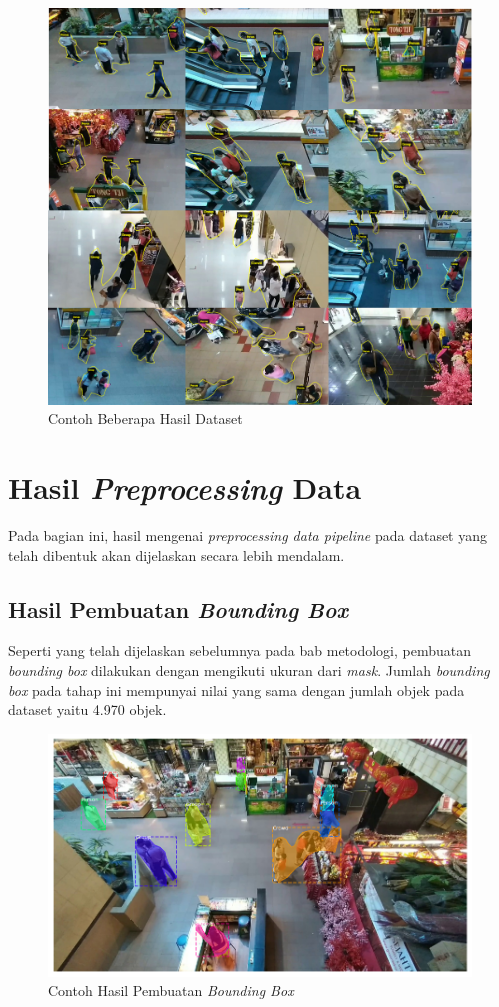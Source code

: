 \begin{figure}[h!]
    \begin{center}
      \includegraphics[width= 0.8\linewidth]{bab4/Dataset.png}
      \caption{Contoh Beberapa Hasil Dataset}
      \label{fig: Dataset}
    \end{center}
\end{figure}

\section{Hasil \textit{Preprocessing} Data}
Pada bagian ini, hasil mengenai \textit{preprocessing data pipeline} pada dataset yang telah dibentuk akan dijelaskan
secara lebih mendalam. 

\subsection{Hasil Pembuatan \textit{Bounding Box}}
Seperti yang telah dijelaskan sebelumnya pada bab metodologi, pembuatan \textit{bounding box} dilakukan dengan
mengikuti ukuran dari \textit{mask}. Jumlah \textit{bounding box} pada tahap ini mempunyai nilai yang sama dengan
jumlah objek pada dataset yaitu 4.970 objek.

\begin{figure}[h!]
  \begin{center}
    \includegraphics[width= 0.8\linewidth]{bab4/Contoh Bounding Box.png}
    \caption{Contoh Hasil Pembuatan \textit{Bounding Box}}
    \label{fig: Contoh Bounding Box}
  \end{center}
\end{figure}

